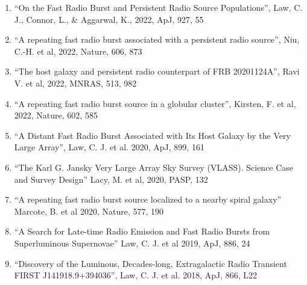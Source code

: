 \documentclass[11pt]{article}
\begin{document}
\begin{enumerate}
    \item ``On the Fast Radio Burst and Persistent Radio Source Populations'', Law, C. J., Connor, L., \& Aggarwal, K., 2022, ApJ, 927, 55

    \item ``A repeating fast radio burst associated with a persistent radio source'', Niu, C.-H. et al, 2022, Nature, 606, 873

    \item ``The host galaxy and persistent radio counterpart of FRB 20201124A'', Ravi V. et al, 2022, MNRAS, 513, 982

    \item ``A repeating fast radio burst source in a globular cluster'', Kirsten, F. et al, 2022, Nature, 602, 585

    \item ``A Distant Fast Radio Burst Associated with Its Host Galaxy by the Very Large Array'', Law, C. J. et al. 2020, ApJ, 899, 161


    \item ``The Karl G. Jansky Very Large Array Sky Survey (VLASS). Science Case and Survey Design'' Lacy, M. et al, 2020, PASP, 132

    \item ``A repeating fast radio burst source localized to a nearby spiral galaxy'' Marcote, B. et al 2020, Nature, 577, 190

    \item ``A Search for Late-time Radio Emission and Fast Radio Bursts from Superluminous Supernovae'' Law, C. J. et al 2019, ApJ, 886, 24
  
    \item ``Discovery of the Luminous, Decades-long, Extragalactic Radio Transient FIRST J141918.9+394036'', Law, C. J. et al. 2018, ApJ, 866, L22




\end{enumerate}
\end{document}
